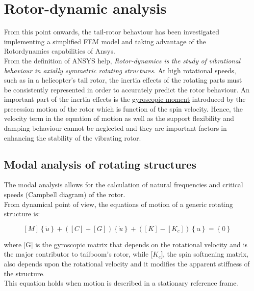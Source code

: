\chapter{Rotor-dynamic analysis}


\noindent
From this point onwards, the tail-rotor behaviour has been investigated implementing a simplified FEM model and taking advantage of the Rotordynamics capabilities of Ansys. \\
From the definition of ANSYS help, \textit{Rotor-dynamics is the study of vibrational behaviour in axially symmetric rotating structures}. At high rotational speeds, such as in a helicopter's tail rotor, the inertia effects of the rotating parts must be consistently represented in order to accurately predict the rotor behaviour. An important part of the inertia effects is the \underline{gyroscopic moment} introduced by the precession motion of the rotor which is function of the spin velocity. Hence, the velocity term in the equation of motion as well as the support flexibility and damping behaviour cannot be neglected and they are important factors in enhancing the stability of the vibrating rotor.



\section*{Modal analysis of rotating structures}
\noindent
The modal analysis allows for the calculation of natural frequencies and critical speeds (Campbell diagram) of the rotor. \\
From dynamical point of view, the equations of motion of a generic rotating structure is:
\medskip

\begin{equation*}
\left[ M \right] \left\lbrace \ddot{u} \right\rbrace + \left( \left[ C \right] + \left[ G \right] \right) \left\lbrace \dot{u} \right\rbrace + \left( \left[ K \right] - \left[ K_c \right] \right) \left\lbrace u \right\rbrace = \left\lbrace 0 \right\rbrace
\end{equation*}


\medskip
\noindent
where [G] is the gyroscopic matrix that depends on the rotational velocity and is the major contributor to tailboom's rotor, while [$K_c$], the spin softnening matrix, also depends upon the rotational velocity and it modifies the apparent stiffness of the structure. \\
This equation holds when motion is described in a stationary reference frame.

